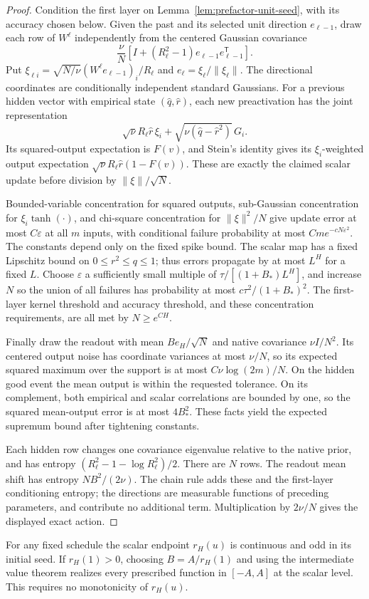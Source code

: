 \begin{proof}
Condition the first layer on Lemma~\ref{lem:prefactor-unit-seed}, with its accuracy chosen below. Given the past and its selected unit direction $e_{\ell-1}$, draw each row of $W^\ell$ independently from the centered Gaussian covariance
\[
 \frac\nu N[I+(R_\ell^2-1)e_{\ell-1}e_{\ell-1}^{\mathsf T}].
\]
Put $\xi_{\ell i}=\sqrt{N/\nu}(W^\ell e_{\ell-1})_i/R_\ell$ and $e_\ell=\xi_\ell/\|\xi_\ell\|$. The directional coordinates are conditionally independent standard Gaussians. For a previous hidden vector with empirical state $(\widehat q,\widehat r)$, each new preactivation has the joint representation
\[
 \sqrt\nu R_\ell\widehat r\,\xi_i+
             \sqrt{\nu(\widehat q-\widehat r^2)}\,G_i.
\]
Its squared-output expectation is $F(v)$, and Stein's identity gives its $\xi_i$-weighted output expectation $\sqrt\nu R_\ell\widehat r(1-F(v))$. These are exactly the claimed scalar update before division by $\|\xi\|/\sqrt N$.

Bounded-variable concentration for squared outputs, sub-Gaussian concentration for $\xi_i\tanh(\cdot)$, and chi-square concentration for $\|\xi\|^2/N$ give update error at most $C\varepsilon$ at all $m$ inputs, with conditional failure probability at most $Cm e^{-cN\varepsilon^2}$. The constants depend only on the fixed spike bound. The scalar map has a fixed Lipschitz bound on $0\le r^2\le q\le1$; thus errors propagate by at most $L^H$ for a fixed $L$. Choose $\varepsilon$ a sufficiently small multiple of $\tau/[(1+B_*)L^H]$, and increase $N$ so the union of all failures has probability at most $c\tau^2/(1+B_*)^2$. The first-layer kernel threshold and accuracy threshold, and these concentration requirements, are all met by $N\ge e^{CH}$.

Finally draw the readout with mean $Be_H/\sqrt N$ and native covariance $\nu I/N^2$. Its centered output noise has coordinate variances at most $\nu/N$, so its expected squared maximum over the support is at most $C\nu\log(2m)/N$. On the hidden good event the mean output is within the requested tolerance. On its complement, both empirical and scalar correlations are bounded by one, so the squared mean-output error is at most $4B_*^2$. These facts yield the expected supremum bound after tightening constants.

Each hidden row changes one covariance eigenvalue relative to the native prior, and has entropy $(R_\ell^2-1-\log R_\ell^2)/2$. There are $N$ rows. The readout mean shift has entropy $NB^2/(2\nu)$. The chain rule adds these and the first-layer conditioning entropy; the directions are measurable functions of preceding parameters, and contribute no additional term. Multiplication by $2\nu/N$ gives the displayed exact action.
\end{proof}

For any fixed schedule the scalar endpoint $r_H(u)$ is continuous and odd in its initial seed. If $r_H(1)>0$, choosing $B=A/r_H(1)$ and using the intermediate value theorem realizes every prescribed function in $[-A,A]$ at the scalar level. This requires no monotonicity of $r_H(u)$.
